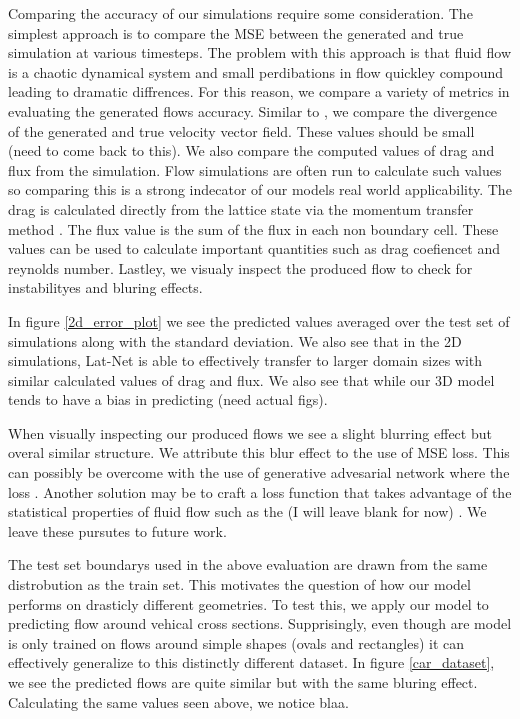 \documentclass{article}
\begin{document}
Comparing the accuracy of our simulations require some consideration. The simplest approach is to compare the MSE between the generated and true simulation at various timesteps. The problem with this approach is that fluid flow is a chaotic dynamical system and small perdibations in flow quickley compound leading to dramatic diffrences. For this reason, we compare a variety of metrics in evaluating the generated flows accuracy. Similar to \cite{tompson2016accelerating}, we compare the divergence of the generated and true velocity vector field. These values should be small (need to come back to this). We also compare the computed values of drag and flux from the simulation. Flow simulations are often run to calculate such values so comparing this is a strong indecator of our models real world applicability. The drag is calculated directly from the lattice state via the momentum transfer method \cite{guo2013lattice}. The flux value is the sum of the flux in each non boundary cell. These values can be used to calculate important quantities such as drag coefiencet and reynolds number. Lastley, we visualy inspect the produced flow to check for instabilityes and bluring effects.

In figure \ref{2d_error_plot} we see the predicted values averaged over the test set of simulations along with the standard deviation. We also see that in the 2D simulations, Lat-Net is able to effectively transfer to larger domain sizes with similar calculated values of drag and flux. We also see that while our 3D model tends to have a bias in predicting (need actual figs).

When visually inspecting our produced flows we see a slight blurring effect but overal similar structure. We attribute this blur effect to the use of MSE loss. This can possibly be overcome with the use of generative advesarial network \cite{goodfellow2014generative} where the loss . Another solution may be to craft a loss function that takes advantage of the statistical properties of fluid flow such as the (I will leave blank for now) \cite{kim2008wavelet}. We leave these pursutes to future work.

The test set boundarys used in the above evaluation are drawn from the same distrobution as the train set. This motivates the question of how our model performs on drasticly different geometries. To test this, we apply our model to predicting flow around vehical cross sections. Supprisingly, even though are model is only trained on flows around simple shapes (ovals and rectangles) it can effectively generalize to this distinctly different dataset. In figure \ref{car_dataset}, we see the predicted flows are quite similar but with the same bluring effect. Calculating the same values seen above, we notice blaa.
\end{document}
